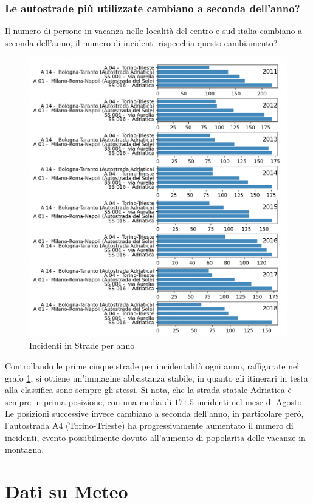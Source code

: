 \documentclass[a4paper]{report}
\begin{document}
\subsection{Le autostrade più utilizzate cambiano a seconda dell'anno?}

Il numero di persone in vacanza nelle località del centro e sud italia cambiano 
a seconda dell'anno, il numero di incidenti rispecchia questo cambiamento?

\begin{figure}
    \includegraphics[width=\linewidth]{../src/incidenti/incidenti_aci/agosto/autostrade.png}
    \caption{Incidenti in Strade per anno}
    \label{fig:autostrade-anno}
\end{figure}

Controllando le prime cinque strade per incidentalità ogni anno, 
raffigurate nel grafo \ref{fig:autostrade-anno}, si ottiene un'immagine 
abbastanza stabile, in quanto gli itinerari in testa alla classifica sono sempre gli stessi.
Si nota, che la strada statale Adriatica è sempre in prima posizione, 
con una media di $171.5$ incidenti nel mese di Agosto.
Le posizioni successive invece cambiano a seconda dell'anno, in particolare per\'o, l'autostrada 
A4 (Torino-Trieste) ha progressivamente aumentato il numero di incidenti, evento possibilmente 
dovuto all'aumento di popolarita delle vacanze in montagna.


\chapter{Dati su Meteo}



\end{document}
